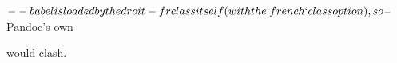 $-- babel is loaded by the droit-fr class itself (with the `french` class option), so
$-- Pandoc's own \usepackage{babel} would clash.
